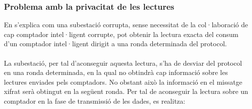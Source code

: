 \subsubsection{Problema amb la privacitat de les lectures}
En \cite{repair-busom} s'explica com una subestació corrupta, sense necessitat de la col·laboració de cap comptador intel·ligent corrupte, pot obtenir la lectura exacta del consum d'un comptador intel·ligent dirigit a una ronda determinada del protocol.
\\
\\
La subestació, per tal d'aconseguir aquesta lectura, s'ha de desviar del protocol en una ronda determinada, en la qual no obtindrà cap informació sobre les lectures enviades pels comptadors. No obstant això la informació en el missatge xifrat serà obtingut en la següent ronda. Per tal de aconseguir la lectura sobre un comptador en la fase de transmissió de les dades, es realitza:
